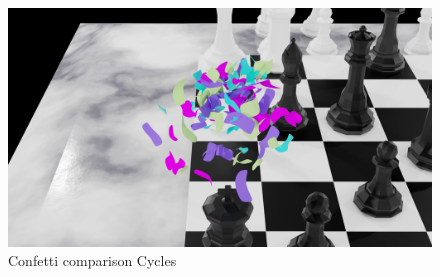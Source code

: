 \documentclass[11pt]{article}
\begin{document}
\begin{figure}[htbp]
\centering
\includegraphics[width=\textwidth]{Images/confetti-cycles.png}
\caption{\label{confetti-cycles}Confetti comparison Cycles}
\end{figure}
\end{document}

